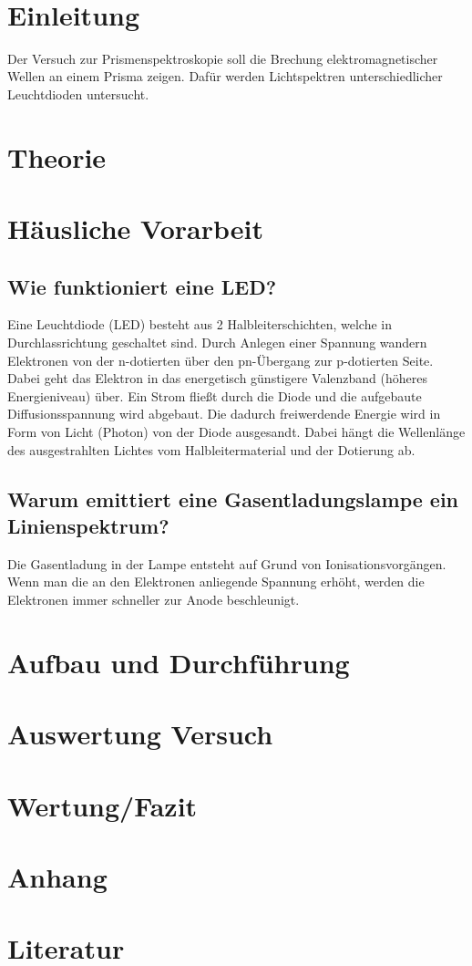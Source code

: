 \documentclass[a4paper]{scrartcl}
\def\header#1#2{
	\begin{center}
		{\Large #1}\\
		{#2}
	\end{center}
}
\numberwithin{equation}{subsection}
\begin{document}
\vspace{10pt}
\header{\HEADDING}{\SUBHEADDING}
	
\tableofcontents
	
\newpage
	
\section{Einleitung}
Der Versuch zur Prismenspektroskopie soll die Brechung elektromagnetischer Wellen an einem Prisma zeigen.
Dafür werden Lichtspektren unterschiedlicher Leuchtdioden untersucht.

\newpage
\section{Theorie}

\newpage
\section{Häusliche Vorarbeit}
\subsection{Wie funktioniert eine LED?}
Eine Leuchtdiode (LED) besteht aus 2 Halbleiterschichten, welche in Durchlassrichtung geschaltet sind.
Durch Anlegen einer Spannung wandern Elektronen von der n-dotierten über den pn-Übergang zur p-dotierten Seite.
Dabei geht das Elektron in das energetisch günstigere Valenzband (höheres Energieniveau) über.
Ein Strom fließt durch die Diode und die aufgebaute Diffusionsspannung wird abgebaut.
Die dadurch freiwerdende Energie wird in Form von Licht (Photon) von der Diode ausgesandt.
Dabei hängt die Wellenlänge des ausgestrahlten Lichtes vom Halbleitermaterial und der Dotierung ab. \cite{leifi}

\subsection{Warum emittiert eine Gasentladungslampe ein Linienspektrum?}
Die Gasentladung in der Lampe entsteht auf Grund von Ionisationsvorgängen.
Wenn man die an den Elektronen anliegende Spannung erhöht, werden die Elektronen immer schneller zur Anode beschleunigt.


\newpage
\section{Aufbau und Durchführung}

\newpage
\section{Auswertung Versuch}

\newpage
\section{Wertung/Fazit}

\newpage
\section{Anhang}

\newpage
\section{Literatur}

\label{LastPage}
\end{document}
